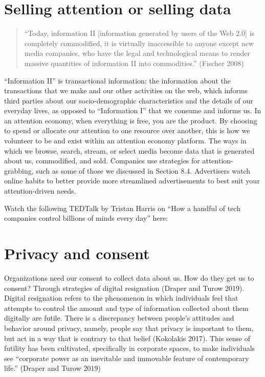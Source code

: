 \documentclass[
  letterpaper,
  DIV=11,
  numbers=noendperiod]{scrreprt}
\begin{document}
\section{Selling attention or selling
data}\label{selling-attention-or-selling-data}

\begin{quote}
``Today, information II {[}information generated by users of the Web
2.0{]} is completely commodified, it is virtually inaccessible to anyone
except new media companies, who have the legal and technological means
to render massive quantities of information II into commodities.''
(Fischer 2008)
\end{quote}

``Information II'' is transactional information: the information about
the transactions that we make and our other activities on the web, which
informs third parties about our socio-demographic characteristics and
the details of our everyday lives, as opposed to ``Information I'' that
we consume and informs us. In an attention economy, when everything is
free, you are the product. By choosing to spend or allocate our
attention to one resource over another, this is how we volunteer to be
and exist within an attention economy platform. The ways in which we
browse, search, stream, or select media become data that is generated
about us, commodified, and sold. Companies use strategies for
attention-grabbing, such as some of those we discussed in Section 8.4.
Advertisers watch online habits to better provide more streamlined
advertisements to best suit your attention-driven needs.

Watch the following TEDTalk by Tristan Harris on ``How a handful of tech
companies control billions of minds every day'' here:

\section{Privacy and consent}\label{privacy-and-consent}

Organizations need our consent to collect data about us. How do they get
us to consent? Through strategies of digital resignation (Draper and
Turow 2019). Digital resignation refers to the phenomenon in which
individuals feel that attempts to control the amount and type of
information collected about them digitally are futile. There is a
discrepancy between people's attitudes and behavior around privacy,
namely, people say that privacy is important to them, but act in a way
that is contrary to that belief (Kokolakis 2017). This sense of futility
has been cultivated, specifically in corporate spaces, to make
individuals see ``corporate power as an inevitable and immovable feature
of contemporary life.'' (Draper and Turow 2019)~
\end{document}
